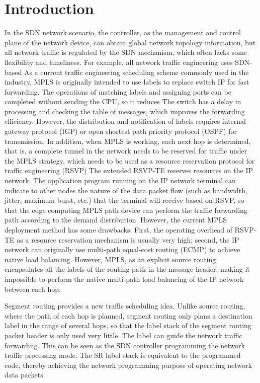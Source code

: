 \documentclass[conference]{IEEEtran}
\begin{document}
\section{Introduction}
In the SDN network scenario, the controller, as the management and control plane of the network device, can obtain global network topology information, but all network traffic is regulated by the SDN mechanism, which often lacks some flexibility and timeliness. For example, all network traffic engineering uses SDN-based
As a current traffic engineering scheduling scheme commonly used in the industry, MPLS is originally intended to use labels to replace switch IP for fast forwarding. The operations of matching labels and assigning ports can be completed without sending the CPU, so it reduces The switch has a delay in processing and checking the table of messages, which improves the forwarding efficiency. However, the distribution and notification of labels requires internal gateway protocol (IGP) or open shortest path priority protocol (OSPF) for transmission. In addition, when MPLS is working, each next hop is determined, that is, a complete tunnel in the network needs to be reserved for traffic under the MPLS strategy, which needs to be used as a resource reservation protocol for traffic engineering (RSVP) The extended RSVP-TE reserves resources on the IP network. The application program running on the IP network terminal can indicate to other nodes the nature of the data packet flow (such as bandwidth, jitter, maximum burst, etc.) that the terminal will receive based on RSVP, so that the edge computing MPLS path device can perform the traffic forwarding path according to the demand distribution. However, the current MPLS deployment method has some drawbacks: First, the operating overhead of RSVP-TE as a resource reservation mechanism is usually very high; second, the IP network can originally use multi-path equal-cost routing (ECMP) to achieve native load balancing. However, MPLS, as an explicit source routing, encapsulates all the labels of the routing path in the message header, making it impossible to perform the native multi-path load balancing of the IP network between each hop.

Segment routing provides a new traffic scheduling idea. Unlike source routing, where the path of each hop is planned, segment routing only plans a destination label in the range of several hops, so that the label stack of the segment routing packet header is only used very little. The label can guide the network traffic forwarding. This can be seen as the SDN controller programming the network traffic processing mode. The SR label stack is equivalent to the programmed code, thereby achieving the network programming purpose of operating network data packets. 
\end{document}
